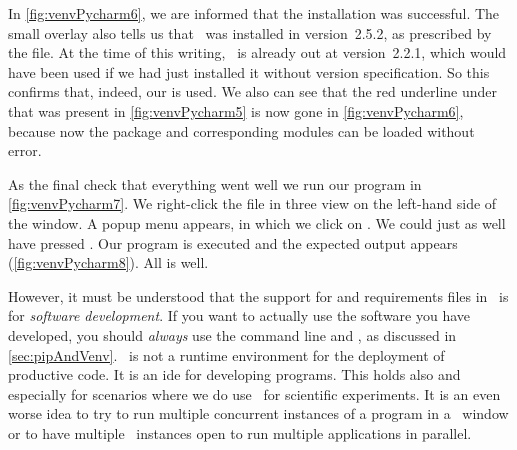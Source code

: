 In \cref{fig:venvPycharm6}, we are informed that the installation was successful.
The small overlay also tells us that \numpy\ was installed in version~2.5.2, as prescribed by the  file.
At the time of this writing, \numpy\ is already out at version~2.2.1, which would have been used if we had just installed it without version specification.
So this confirms that, indeed, our  is used.
We also can see that the red underline under  that was present in \cref{fig:venvPycharm5} is now gone in \cref{fig:venvPycharm6}, because now the package and corresponding modules can be loaded without error.

As the final check that everything went well we run our program  in \cref{fig:venvPycharm7}.
We right-click the file in three view on the left-hand side of the window.
A popup menu appears, in which we click on .
We could just as well have pressed .
Our program is executed and the expected output appears (\cref{fig:venvPycharm8}).
All is well.

However, it must be understood that the support for  and requirements files in \pycharm\ is for \emph{software development}.
If you want to actually use the software you have developed, you should \emph{always} use the command line and , as discussed in \cref{sec:pipAndVenv}.
\pycharm\ is not a runtime environment for the deployment of productive code.
It is an \acrfull{ide} for developing programs.%
%
%
%
This holds also and especially for scenarios where we do use \python\ for scientific experiments.
It is an even worse idea to try to run multiple concurrent instances of a program in a \pycharm\ window or to have multiple \pycharm\ instances open to run multiple applications in parallel.%
%
\FloatBarrier%
\endhsection%
%
